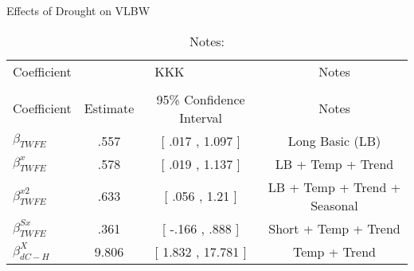 \begin{table}[!ht]
\centering
\caption{Effects of Drought on VLBW}\label{tab:twfe_vlbw_test}
\fontsize{10pt}{12pt}\selectfont
\begin{tabular}{lccc}
\toprule

 \multicolumn{1}{c}{Coefficient} &\multicolumn{2}{c}{KKK}&\multicolumn{1}{c}{Notes}\\\cmidrule(lr){2-3}\cmidrule(lr){4-4} \\
 
 \multicolumn{1}{c}{Coefficient}  &\multicolumn{1}{c}{Estimate}&\multicolumn{1}{c}{95\% Confidence Interval}&\multicolumn{1}{c}{Notes} \\
 
\midrule
 $ \beta_{TWFE} $ & .557  & [ .017 ,  1.097 ] & Long Basic (LB) \\
 \addlinespace
 $ \beta^{x}_{TWFE} $ & .578  &  [ .019 ,  1.137  ] & LB + Temp + Trend \\
 $ \beta^{x2}_{TWFE} $ & .633  & [ .056 ,  1.21  ] & LB + Temp + Trend + Seasonal \\
 $ \beta^{Sx}_{TWFE} $ & .361  & [ -.166 ,  .888  ] & Short + Temp + Trend \\
 $ \beta^{X}_{dC-H} $ & 9.806  & [ 1.832 ,  17.781 ] & Temp + Trend \\
\bottomrule
\end{tabular}
\caption*{\footnotesize{Notes:}}
\end{table}
